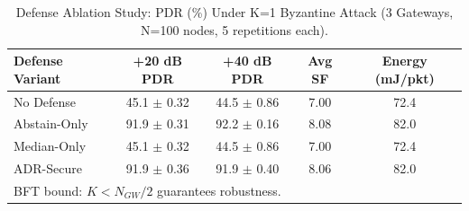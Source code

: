 \begin{table}[t]
\centering
\caption{Defense Ablation Study: PDR (\%) Under K=1 Byzantine Attack (3 Gateways, N=100 nodes, 5 repetitions each).}
\label{tab:ablation}
\begin{tabular}{lcccc}
\hline
Defense Variant & +20 dB PDR & +40 dB PDR & Avg SF & Energy (mJ/pkt) \\
\hline
No Defense & 45.1 $\pm$ 0.32 & 44.5 $\pm$ 0.86 & 7.00 & 72.4 \\
Abstain-Only & 91.9 $\pm$ 0.31 & 92.2 $\pm$ 0.16 & 8.08 & 82.0 \\
Median-Only & 45.1 $\pm$ 0.32 & 44.5 $\pm$ 0.86 & 7.00 & 72.4 \\
ADR-Secure & 91.9 $\pm$ 0.36 & 91.9 $\pm$ 0.40 & 8.06 & 82.0 \\
\hline
\multicolumn{5}{l}{\footnotesize BFT bound: $K < N_{GW}/2$ guarantees robustness.} \\
\end{tabular}
\end{table}
